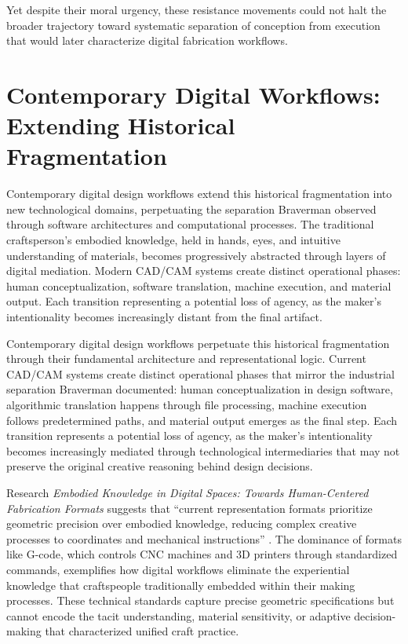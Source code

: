 \vspace{0.5cm}

Yet despite their moral urgency, these resistance movements could not halt the broader trajectory toward systematic separation of conception from execution that would later characterize digital fabrication workflows.

\section{Contemporary Digital Workflows: Extending Historical Fragmentation}

Contemporary digital design workflows extend this historical fragmentation into new technological domains, perpetuating the separation Braverman observed through software architectures and computational processes. The traditional craftsperson's embodied knowledge, held in hands, eyes, and intuitive understanding of materials, becomes progressively abstracted through layers of digital mediation. Modern CAD/CAM systems create distinct operational phases: human conceptualization, software translation, machine execution, and material output. Each transition representing a potential loss of agency, as the maker's intentionality becomes increasingly distant from the final artifact.

\vspace{0.5cm}

Contemporary digital design workflows perpetuate this historical fragmentation through their fundamental architecture and representational logic. Current CAD/CAM systems create distinct operational phases that mirror the industrial separation Braverman documented: human conceptualization in design software, algorithmic translation happens through file processing, machine execution follows predetermined paths, and material output emerges as the final step. Each transition represents a potential loss of agency, as the maker's intentionality becomes increasingly mediated through technological intermediaries that may not preserve the original creative reasoning behind design decisions.

\vspace{0.5cm}

Research \textit{Embodied Knowledge in Digital Spaces: Towards Human-Centered Fabrication Formats} suggests that ``current representation formats prioritize geometric precision over embodied knowledge, reducing complex creative processes to coordinates and mechanical instructions'' \citep{munoz2025}. The dominance of formats like G-code, which controls CNC machines and 3D printers through standardized commands, exemplifies how digital workflows eliminate the experiential knowledge that craftspeople traditionally embedded within their making processes. These technical standards capture precise geometric specifications but cannot encode the tacit understanding, material sensitivity, or adaptive decision-making that characterized unified craft practice.

